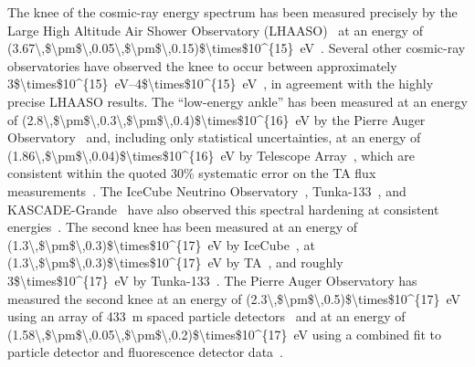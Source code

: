 The knee of the cosmic-ray energy spectrum has been measured precisely by the Large High Altitude Air Shower Observatory (LHAASO)~\cite{lhaaso_chaa2019} at an energy of \qty[parse-numbers=false]{(3.67\,$\pm$\,0.05\,$\pm$\,0.15)$\times$10^{15}}{\electronvolt}~\cite{lhaaso_prl2024_spectrum}.
Several other cosmic-ray observatories have observed the knee to occur between approximately \qtyrange[parse-numbers=false]{3$\times$10^{15}}{4$\times$10^{15}}{\electronvolt}~\cite{tibet3_apj2008_spectrum, tunka_nima2014_spectrum, icecube_prd2020_spectrum}, in agreement with the highly precise LHAASO results.
The ``low-energy ankle'' has been measured at an energy of \qty[parse-numbers=false]{(2.8\,$\pm$\,0.3\,$\pm$\,0.4)$\times$10^{16}}{\electronvolt} by the Pierre Auger Observatory~\cite{icrc2021_novotny_spectrum} and, including only statistical uncertainties, at an energy of \qty[parse-numbers=false]{(1.86\,$\pm$\,0.04)$\times$10^{16}}{\electronvolt} by Telescope Array~\cite{icrc2023_ta_spectrum}, which are consistent within the quoted 30\% systematic error on the TA flux measurements~\cite{icrc2023_ta_spectrum,ta_astrophys2018_spectrum}.
The IceCube Neutrino Observatory~\cite{icecube_jinst2016_detector}, Tunka-133~\cite{tunka_nima2012_detector}, and KASCADE-Grande~\cite{kascadegrande_nima2010_detector} have also observed this spectral hardening at consistent energies~\cite{icecube_prd2013_spectrum,tunka_astropartphys2020_spectrum,kascadegrande_astropartphys2012_spectrum}.
The second knee has been measured at an energy of \qty[parse-numbers=false]{(1.3\,$\pm$\,0.3)$\times$10^{17}}{\electronvolt} by IceCube~\cite{icecube_prd2013_spectrum}, at \qty[parse-numbers=false]{(1.3\,$\pm$\,0.3)$\times$10^{17}}{\electronvolt} by TA~\cite{icrc2025_ta_tale_spectrum}, and roughly \qty[parse-numbers=false]{3$\times$10^{17}}{\electronvolt} by Tunka-133~\cite{tunka_astropartphys2020_spectrum}.
The Pierre Auger Observatory has measured the second knee at an energy of \qty[parse-numbers=false]{(2.3\,$\pm$\,0.5)$\times$10^{17}}{\electronvolt} using an array of \qty{433}{\meter} spaced particle detectors~\cite{icrc2023_gaby_spectrum} and at an energy of \qty[parse-numbers=false]{(1.58\,$\pm$\,0.05\,$\pm$\,0.2)$\times$10^{17}}{\electronvolt} using a combined fit to particle detector and fluorescence detector data~\cite{icrc2021_novotny_spectrum}.

